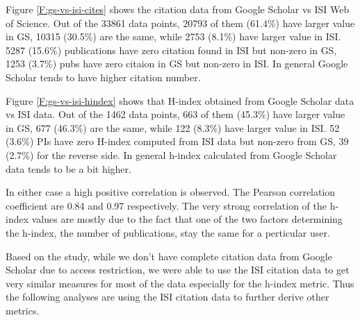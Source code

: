 Figure \ref{F:gs-vs-isi-cites} shows the citation data from Google Scholar vs ISI Web of Science. Out of the 33861 data points, 20793 of them (61.4\%) have larger value in GS, 10315 (30.5\%) are the same, while 2753 (8.1\%) have larger value in ISI. 5287 (15.6\%) publications have zero citation found in ISI but non-zero in GS, 1253 (3.7\%) pubs have zero citaion in GS but non-zero in ISI. In general Google Scholar tends to have higher citation number.

Figure \ref{F:gs-vs-isi-hindex} shows that H-index obtained from Google Scholar data vs ISI data. Out of the 1462 data points, 663 of them (45.3\%) have larger value in GS, 677 (46.3\%) are the same, while 122 (8.3\%) have larger value in ISI.
52 (3.6\%) PIs have zero H-index computed from ISI data but non-zero from GS, 39 (2.7\%) for the reverse side. In general h-index calculated from Google Scholar data tends to be a bit higher.

In either case a high positive correlation is observed. The Pearson correlation coefficient are 0.84 and 0.97 respectively. The very strong correlation of the h-index values are mostly due to the fact that one of the two factors determining the h-index, the number of publications, stay the same for a perticular user.

Based on the study, while we don't have complete citation data from Google Scholar due to access restriction, we were able to use the ISI citation data to get very similar measures for most of the data especially for the h-index metric. Thus the following analyses are using the ISI citation data to further derive other metrics.
